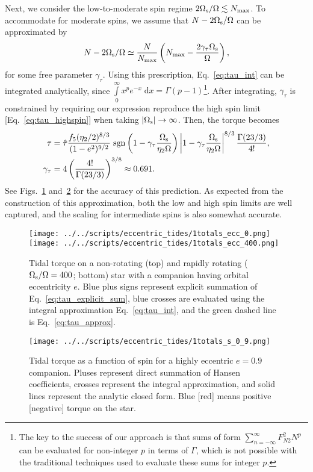 \documentclass[
        fleqn,
        usenatbib,
    ]{mnras}
\newcommand*{\abs}[1]{\left|#1\right|}
\newcommand*{\p}[1]{\left(#1\right)}
\begin{document}
Next, we consider the low-to-moderate spin regime $2\Omega_{\rm s}/\Omega \lesssim
N_{\max}$. To accommodate for moderate spins, we assume that $N -
2\Omega_{\rm s}/\Omega$ can be approximated by
\begin{equation}
    N - 2\Omega_{\rm s} / \Omega \simeq \frac{N}{N_{\max}}
        \left(N_{\max} - \frac{2\gamma_\tau
        \Omega_{\rm s}}{\Omega}\right)\label{eq:nmax_ansatz},
\end{equation}
for some free parameter $\gamma_\tau$. Using this prescription,
Eq.~\eqref{eq:tau_int} can be integrated analytically, since
$\int\limits_0^\infty x^pe^{-x}\;\mathrm{d}x = \Gamma(p - 1)$\footnote{The key
to the success of our approach is that sums of form $\sum\limits_{n =
-\infty}^\infty F_{N2}^2 N^p$ can be evaluated for non-integer $p$ in terms of
$\Gamma$, which is not possible with the traditional techniques used to evaluate
these sums for integer $p$.}. After integrating, $\gamma_\tau$ is constrained by
requiring our expression reproduce the high spin limit
[Eq.~\eqref{eq:tau_highspin}] when taking $\abs{\Omega_{\rm s}} \to \infty$.
Then, the torque becomes
\begin{align}
    \tau &= \hat{\tau} \frac{f_5 (\eta_2/2)^{8/3}}{(1 - e^2)^{9/2}}
        \;\mathrm{sgn}\left(1 - \gamma_\tau\frac{\Omega_{\rm s}}{\eta_2\Omega}\right)
            \left|1 - \gamma_\tau\frac{\Omega_{\rm s}}{\eta_2\Omega}\right|^{8/3}
            \frac{\Gamma(23/3)}{4!},\label{eq:tau_approx}\\
    \gamma_\tau &= 4\p{\frac{4!}{\Gamma(23/3)}}^{3/8} \approx 0.691.
\end{align}
See Figs.~\ref{fig:totals_ecc0} and~\ref{fig:totals_s} for the accuracy of this
prediction. As expected from the construction of this approximation, both the
low and high spin limits are well captured, and the scaling for intermediate
spins is also somewhat accurate.
\begin{figure}
    \centering
    \texttt{[image: ../../scripts/eccentric\_tides/1totals\_ecc\_0.png]}
    \texttt{[image: ../../scripts/eccentric\_tides/1totals\_ecc\_400.png]}
    \caption{Tidal torque on a non-rotating (top) and rapidly rotating
    ($\Omega_{\rm s} / \Omega = 400$; bottom) star with a companion having
    orbital eccentricity $e$. Blue plus signs represent explicit summation of
    Eq.~\eqref{eq:tau_explicit_sum}, blue crosses are evaluated using the
    integral approximation Eq.~\eqref{eq:tau_int}, and the green dashed line
    is Eq.~\eqref{eq:tau_approx}.}\label{fig:totals_ecc0}
\end{figure}
\begin{figure}
    \centering
    \texttt{[image: ../../scripts/eccentric\_tides/1totals\_s\_0\_9.png]}
    \caption{Tidal torque as a function of spin for a highly eccentric $e = 0.9$
    companion. Pluses represent direct summation of Hansen coefficients, crosses
    represent the integral approximation, and solid lines represent the
    analytic closed form. Blue [red] means positive [negative]
    torque on the star.}\label{fig:totals_s}
\end{figure}
\end{document}
